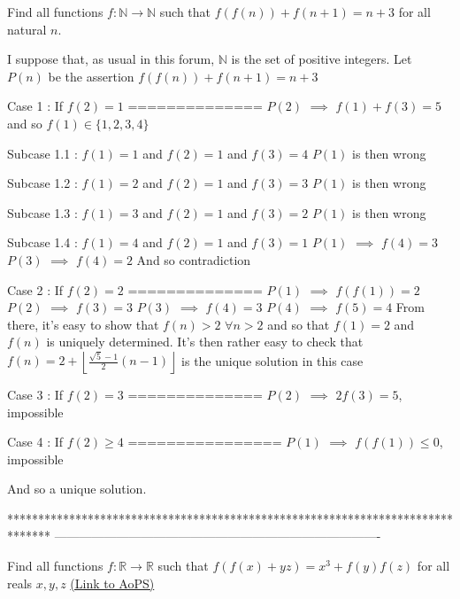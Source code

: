 \begin{solution}
	\begin{tcolorbox}Find all functions $f:\mathbb{N}\to \mathbb{N}$ such that $f(f(n))+f(n+1)=n+3$ for all natural $n$.\end{tcolorbox}
I suppose that, as usual in this forum, $\mathbb N$ is the set of positive integers.
Let $P(n)$ be the assertion $f(f(n))+f(n+1)=n+3$

Case 1 : If $f(2)=1$
==============
$P(2)$ $\implies$ $f(1)+f(3)=5$ and so $f(1)\in\{1,2,3,4\}$

Subcase 1.1 : $f(1)=1$ and $f(2)=1$ and $f(3)=4$
$P(1)$ is then wrong

Subcase 1.2 : $f(1)=2$ and $f(2)=1$ and $f(3)=3$
$P(1)$ is then wrong

Subcase 1.3 : $f(1)=3$ and $f(2)=1$ and $f(3)=2$
$P(1)$ is then wrong

Subcase 1.4 : $f(1)=4$ and $f(2)=1$ and $f(3)=1$
$P(1)$ $\implies$ $f(4)=3$
$P(3)$ $\implies$ $f(4)=2$
And so contradiction


Case 2 : If $f(2)=2$
==============
$P(1)$ $\implies$ $f(f(1))=2$
$P(2)$ $\implies$ $f(3)=3$
$P(3)$ $\implies$ $f(4)=3$
$P(4)$ $\implies$ $f(5)=4$
From there, it's easy to show that $f(n)>2$ $\forall n>2$ and so that $f(1)=2$ and $f(n)$ is uniquely determined.
It's then rather easy to check that $\boxed{f(n)=2+\left\lfloor\frac{\sqrt 5-1}2(n-1)\right\rfloor}$ is the unique solution in this case

Case 3 : If $f(2)=3$
==============
$P(2)$ $\implies$ $2f(3)=5$, impossible


Case 4 : If $f(2)\ge 4$
================
$P(1)$ $\implies$ $f(f(1))\le 0$, impossible



And so a unique solution.
\end{solution}
*******************************************************************************
-------------------------------------------------------------------------------

\begin{problem}
	Find all functions $f:\mathbb{R}\to \mathbb{R}$ such that $f(f(x)+yz)=x^3+f(y)f(z)$  for all reals $x,y,z$
	\flushright \href{https://artofproblemsolving.com/community/c6h599003}{(Link to AoPS)}
\end{problem}



